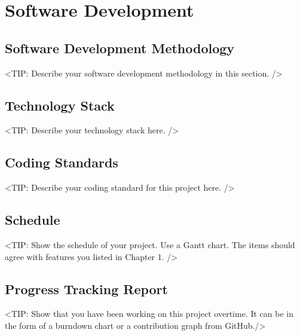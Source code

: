 \chapter{Software Development}
\label{chap:software-development}

\section{Software Development Methodology}
\label{section:software-development-methodology}
<TIP: Describe your software development methodology in this section. />

\section{Technology Stack}
\label{section:technology-stack}
<TIP: Describe your technology stack here. />

\section{Coding Standards}
\label{section:coding-standards}
<TIP: Describe your coding standard for this project here. />

\section{Schedule}
\label{section:schedule}
<TIP: Show the schedule of your project.
Use a Gantt chart. The items should agree with features
you listed in Chapter 1. />

\section{Progress Tracking Report}
\label{section:progress-tracking-report}
<TIP: Show that you have been working on this project overtime.
It can be in the form of a burndown chart or a contribution graph from GitHub./>